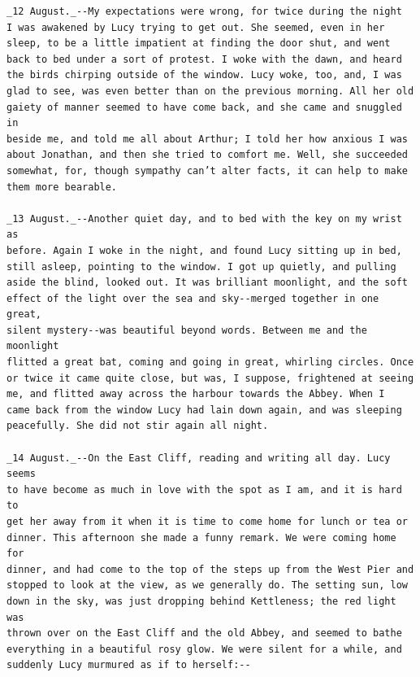 \documentclass{article}
\begin{document}
\begin{verbatim}
_12 August._--My expectations were wrong, for twice during the night
I was awakened by Lucy trying to get out. She seemed, even in her
sleep, to be a little impatient at finding the door shut, and went
back to bed under a sort of protest. I woke with the dawn, and heard
the birds chirping outside of the window. Lucy woke, too, and, I was
glad to see, was even better than on the previous morning. All her old
gaiety of manner seemed to have come back, and she came and snuggled in
beside me, and told me all about Arthur; I told her how anxious I was
about Jonathan, and then she tried to comfort me. Well, she succeeded
somewhat, for, though sympathy can’t alter facts, it can help to make
them more bearable.

_13 August._--Another quiet day, and to bed with the key on my wrist as
before. Again I woke in the night, and found Lucy sitting up in bed,
still asleep, pointing to the window. I got up quietly, and pulling
aside the blind, looked out. It was brilliant moonlight, and the soft
effect of the light over the sea and sky--merged together in one great,
silent mystery--was beautiful beyond words. Between me and the moonlight
flitted a great bat, coming and going in great, whirling circles. Once
or twice it came quite close, but was, I suppose, frightened at seeing
me, and flitted away across the harbour towards the Abbey. When I
came back from the window Lucy had lain down again, and was sleeping
peacefully. She did not stir again all night.

_14 August._--On the East Cliff, reading and writing all day. Lucy seems
to have become as much in love with the spot as I am, and it is hard to
get her away from it when it is time to come home for lunch or tea or
dinner. This afternoon she made a funny remark. We were coming home for
dinner, and had come to the top of the steps up from the West Pier and
stopped to look at the view, as we generally do. The setting sun, low
down in the sky, was just dropping behind Kettleness; the red light was
thrown over on the East Cliff and the old Abbey, and seemed to bathe
everything in a beautiful rosy glow. We were silent for a while, and
suddenly Lucy murmured as if to herself:--


\end{verbatim}
\end{document}
